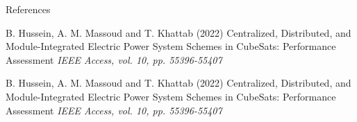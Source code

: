 \documentclass[aspectratio=169]{beamer}
\begin{document}
	
	
	\begin{frame}[allowframebreaks]{References}
	
	\begin{thebibliography}{9}
		
	B. Hussein, A. M. Massoud and T. Khattab (2022)
	\newblock Centralized, Distributed, and Module-Integrated Electric Power System Schemes in CubeSats: Performance Assessment
	\newblock \emph{ IEEE Access, vol. 10, pp. 55396-55407}


B. Hussein, A. M. Massoud and T. Khattab (2022)
\newblock Centralized, Distributed, and Module-Integrated Electric Power System Schemes in CubeSats: Performance Assessment
\newblock \emph{ IEEE Access, vol. 10, pp. 55396-55407}


	\end{thebibliography}
	\end{frame}
	
	\begin{frame}
		
		
	\end{frame}
\end{document}
